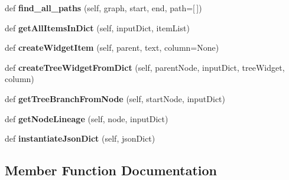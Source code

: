 \begin{DoxyCompactItemize}
\item 
\mbox{\label{class_dsg_tools_1_1_utils_1_1utils_1_1_utils_a78c7dfe1b21322c403bc3a3f4e9d0cd6}} 
def {\bfseries find\+\_\+all\+\_\+paths} (self, graph, start, end, path=\mbox{[}$\,$\mbox{]})
\item 
\mbox{\label{class_dsg_tools_1_1_utils_1_1utils_1_1_utils_a5e992f901b8b3bb385fb8b6dd07ca091}} 
def {\bfseries get\+All\+Items\+In\+Dict} (self, input\+Dict, item\+List)
\item 
\mbox{\label{class_dsg_tools_1_1_utils_1_1utils_1_1_utils_a5fdf63737b7707ccdb9dd9b01257cd3d}} 
def {\bfseries create\+Widget\+Item} (self, parent, text, column=None)
\item 
\mbox{\label{class_dsg_tools_1_1_utils_1_1utils_1_1_utils_a457ab0f219747d39dd1272b3e176a258}} 
def {\bfseries create\+Tree\+Widget\+From\+Dict} (self, parent\+Node, input\+Dict, tree\+Widget, column)
\item 
\mbox{\label{class_dsg_tools_1_1_utils_1_1utils_1_1_utils_a6561c58e285a06d297dd59c4cd8d21b9}} 
def {\bfseries get\+Tree\+Branch\+From\+Node} (self, start\+Node, input\+Dict)
\item 
\mbox{\label{class_dsg_tools_1_1_utils_1_1utils_1_1_utils_ae2c1e9264401b69106e0dec59863ac58}} 
def {\bfseries get\+Node\+Lineage} (self, node, input\+Dict)
\item 
\mbox{\label{class_dsg_tools_1_1_utils_1_1utils_1_1_utils_a76672c4b5aa9c59d353fa95034ea35f6}} 
def {\bfseries instantiate\+Json\+Dict} (self, json\+Dict)
\end{DoxyCompactItemize}


\subsection{Member Function Documentation}
\mbox{\label{class_dsg_tools_1_1_utils_1_1utils_1_1_utils_ad03cd0daee48819be7fbb0f1bb30c4d0}} 
